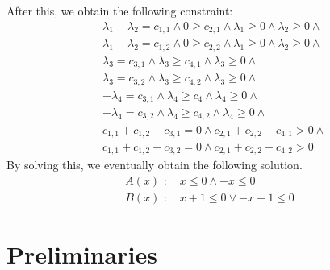 After this, we obtain the following constraint:
\begin{align*}
& \lambda_1 - \lambda_2 = c_{1,1} \wedge 0 \geq c_{2,1} \wedge \lambda_1 \geq 0 \wedge \lambda_2 \geq 0 \wedge \\
& \lambda_1 - \lambda_2 = c_{1,2} \wedge 0 \geq c_{2,2} \wedge \lambda_1 \geq 0 \wedge \lambda_2 \geq 0 \wedge \\
& \lambda_3 = c_{3,1} \wedge \lambda_3 \geq c_{4,1} \wedge \lambda_3 \geq 0 \wedge \\
& \lambda_3 = c_{3,2} \wedge \lambda_3 \geq c_{4,2} \wedge \lambda_3 \geq 0 \wedge \\
& - \lambda_4 = c_{3,1} \wedge \lambda_4 \geq c_4 \wedge \lambda_4 \geq 0 \wedge \\
& - \lambda_4 = c_{3,2} \wedge \lambda_4 \geq c_{4,2} \wedge \lambda_4 \geq 0 \wedge \\
& c_{1,1} + c_{1,2} + c_{3,1} = 0 \wedge c_{2,1} + c_{2,2} + c_{4,1} > 0 \wedge \\
& c_{1,1} + c_{1,2} + c_{3,2} = 0 \wedge c_{2,1} + c_{2,2} + c_{4,2} > 0
\end{align*}
By solving this, we eventually obtain the following solution.
\begin{align*}
A(x) \text{ : } & x \leq 0 \wedge -x \leq 0 \\
B(x) \text{ : } & x+1 \leq 0 \vee -x+1 \leq 0
\end{align*}

\section{Preliminaries}

